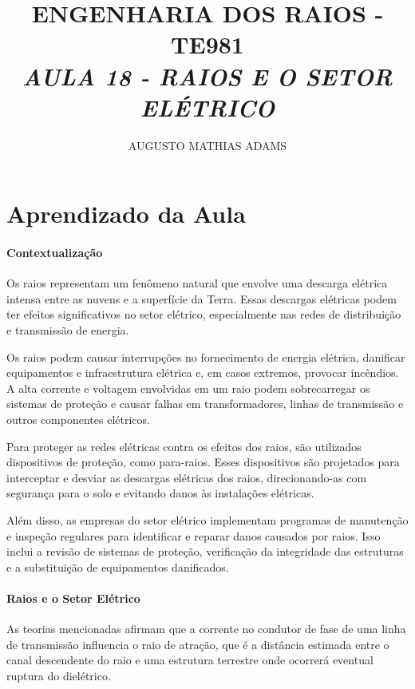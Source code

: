\documentclass[a4paper, 12pt, onecolumn,singlespacing]{article}
\title{\normalsize{ENGENHARIA DOS RAIOS - TE981}\\ \huge{\textbf\textit{{AULA 18 - RAIOS E O SETOR ELÉTRICO}}\\}}
\author{\small{AUGUSTO MATHIAS ADAMS}}
\begin{document}
	
	\maketitle
	
	\section{Aprendizado da Aula}
	
	\paragraph{Contextualização}
	
	Os raios representam um fenômeno natural que envolve uma descarga elétrica intensa entre as nuvens e a superfície da Terra. Essas descargas elétricas podem ter efeitos significativos no setor elétrico, especialmente nas redes de distribuição e transmissão de energia.
	
	Os raios podem causar interrupções no fornecimento de energia elétrica, danificar equipamentos e infraestrutura elétrica e, em casos extremos, provocar incêndios. A alta corrente e voltagem envolvidas em um raio podem sobrecarregar os sistemas de proteção e causar falhas em transformadores, linhas de transmissão e outros componentes elétricos.
	
	Para proteger as redes elétricas contra os efeitos dos raios, são utilizados dispositivos de proteção, como para-raios. Esses dispositivos são projetados para interceptar e desviar as descargas elétricas dos raios, direcionando-as com segurança para o solo e evitando danos às instalações elétricas.
	
	Além disso, as empresas do setor elétrico implementam programas de manutenção e inspeção regulares para identificar e reparar danos causados por raios. Isso inclui a revisão de sistemas de proteção, verificação da integridade das estruturas e a substituição de equipamentos danificados.
	
	\paragraph{Raios e o Setor Elétrico}
	
	As teorias mencionadas afirmam que a corrente no condutor de fase de uma linha de transmissão influencia o raio de atração, que é a distância estimada entre o canal descendente do raio e uma estrutura terrestre onde ocorrerá eventual ruptura do dielétrico.
	
\end{document}
